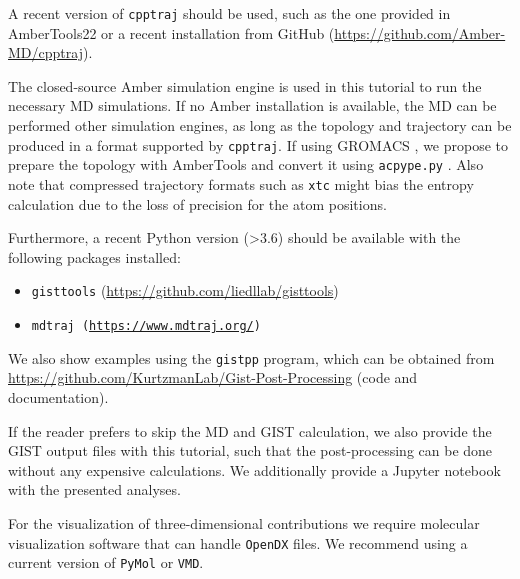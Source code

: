 \documentclass[9pt,tutorial]{livecoms}
\newcommand{\software}{\texttt}
\newcommand\inlinecode{\texttt}
\begin{document}
A recent version of \software{cpptraj} should be used, such as the one provided in AmberTools22 or a recent installation from GitHub (\url{https://github.com/Amber-MD/cpptraj}).

The closed-source Amber simulation engine is used in this tutorial to run the necessary MD simulations.
If no Amber installation is available, the MD can be performed other simulation engines, as long as the topology and trajectory can be produced in a format supported by \software{cpptraj}.
If using GROMACS \cite{Abraham2015-gromacs,Pronk2013-gromacs}, we propose to prepare the topology with AmberTools and convert it using \software{acpype.py} \cite{Sousa_da_Silva2012-acpype}.
Also note that compressed trajectory formats such as \inlinecode{xtc} might bias the entropy calculation due to the loss of precision for the atom positions.

Furthermore, a recent Python version (>3.6) should be available with the following packages installed:
\begin{itemize}
	\item \software{gisttools} (\url{https://github.com/liedllab/gisttools})
	\item \software{mdtraj (\url{https://www.mdtraj.org/})}
\end{itemize}

We also show examples using the \software{gistpp} program, which can be obtained from \url{https://github.com/KurtzmanLab/Gist-Post-Processing} (code and documentation).

If the reader prefers to skip the MD and GIST calculation, we also provide the GIST output files with this tutorial, such that the post-processing can be done without any expensive calculations.
We additionally provide a Jupyter notebook \cite{Kluyver2016-jupyter,Granger2021-jupyter} with the presented analyses. 

For the visualization of three-dimensional contributions we require molecular visualization software that can handle \software{OpenDX} files.
We recommend using a current version of \software{PyMol}\cite{pymol} or \software{VMD}\cite{vmd}.
\end{document}
